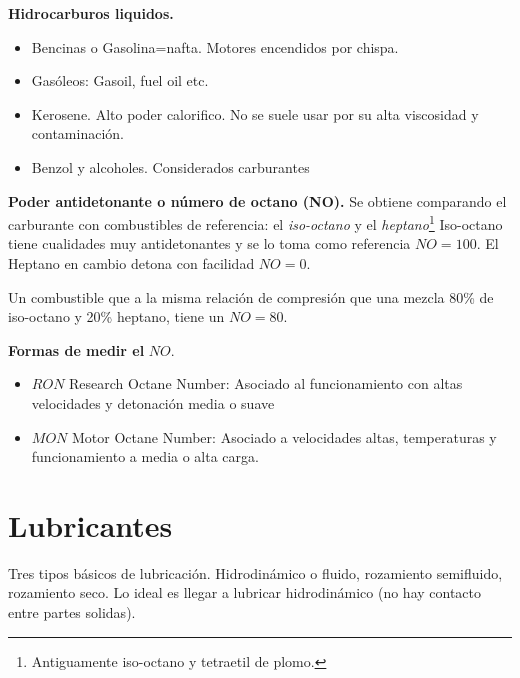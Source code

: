 {\bf Hidrocarburos liquidos.}
\begin{itemize}
\item Bencinas o Gasolina=nafta. Motores encendidos por chispa.
\item Gasóleos: Gasoil, fuel oil etc.
\item Kerosene. Alto poder calorifico. No se suele usar por su alta viscosidad y contaminación.
\item Benzol y alcoholes. Considerados carburantes
\end{itemize}

{\bf Poder antidetonante o número de octano (NO).}
Se obtiene comparando el carburante con combustibles de referencia: el \emph{iso-octano} y el \emph{heptano}\footnote{Antiguamente iso-octano y tetraetil de plomo.}
Iso-octano tiene cualidades muy antidetonantes y se lo toma como referencia $NO=100$. El Heptano en cambio detona con facilidad $NO=0$.

Un combustible que a la misma relación de compresión que una mezcla 80\% de iso-octano y 20\% heptano, tiene un $NO=80$.

{\bf Formas de medir el} $NO$.
\begin{itemize}
    \item $RON$ Research Octane Number: Asociado al funcionamiento con altas velocidades y detonación media o suave
    \item $MON$ Motor Octane Number: Asociado a velocidades altas, temperaturas y funcionamiento a media o alta carga.
\end{itemize}

\section{Lubricantes}
Tres tipos básicos de lubricación. Hidrodinámico o fluido, rozamiento semifluido, rozamiento seco. Lo ideal es llegar a lubricar hidrodinámico (no hay contacto entre partes solidas).

